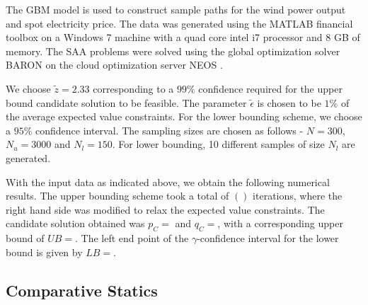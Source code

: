 The GBM model is used to construct sample paths for the wind power output and
spot electricity price. The data was generated using the MATLAB
financial toolbox on a Windows 7 machine with a quad core intel i7 processor and
8 GB of memory. The SAA problems were solved using the global optimization
solver BARON \citep{baron1} on the cloud optimization server NEOS
\citep{neos1,neos2,neos3}. 

We choose $\tilde{z} = 2.33$ corresponding to a
$99\%$ confidence required for the upper bound candidate solution to be
feasible. The parameter $\tilde{\epsilon}$ is chosen to be $1\%$ of the average
expected value constraints. For the lower bounding scheme, we choose a $95\%$
confidence interval. The sampling sizes are chosen as follows - $N = 300$, $N_u
= 3000$ and $N_l = 150$. For lower bounding, 10 different samples of size $N_l$
are generated. 

With the input data as indicated above, we obtain the following numerical
results. The upper bounding scheme took a total of $()$ iterations, where the
right hand side was modified to relax the expected value constraints. The
candidate solution obtained was $p_C = $ and $q_C = $, with a corresponding
upper bound of $UB = $. The left end point of the
$\gamma$-confidence interval for the lower bound is given by $LB = $. 

\subsection*{Comparative Statics}

